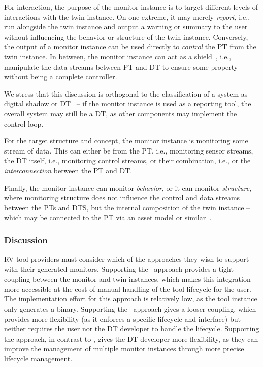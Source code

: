 For interaction, the purpose of the monitor instance is to target different levels of interactions with the twin instance.
On one extreme, it may merely \emph{report}, i.e., run alongside the twin instance and output a warning or summary to the user without influencing the behavior or structure of the twin instance.
Conversely, the output of a monitor instance can be used directly to \emph{control} the PT from the twin instance.
In between, the monitor instance can act as a  shield~\cite{DBLP:conf/tacas/BloemKKW15}, i.e., manipulate the data streams between PT and DT to ensure some property without being a complete controller.

We stress that this discussion is orthogonal to the classification of a system as digital shadow or DT~\cite{KRITZINGER20181016} -- if the monitor instance is used as a reporting tool, the overall system may still be a DT, as other components may implement the control loop.

For the target structure and concept, the monitor instance is monitoring some stream of data. This can either be from the PT, i.e., monitoring sensor streams, the DT itself, i.e., monitoring control streams, or their combination, i.e., or the \emph{interconnection} between the PT and DT.

Finally, the monitor instance can monitor \emph{behavior}, or it can monitor \emph{structure}, where monitoring structure does not influence the control and data streams between the PTs and DTS, but the internal composition of the twin instance -- which may be connected to the PT via an asset model or similar~\cite{DBLP:conf/isola/KamburjanKSTCJ22}.


\subsubsection{Discussion}
RV tool providers must consider which of the approaches they wish to support with their generated monitors.
Supporting the \methodone\ approach provides a tight coupling between the monitor and twin instances, which makes this integration more accessible at the cost of manual handling of the tool lifecycle for the user.
The implementation effort for this approach is relatively low, as the tool instance only generates a binary.
Supporting the \methodtwo\ approach gives a looser coupling, which provides more flexibility (as it enforces a specific lifecycle and interface) but neither requires the user nor the DT developer to handle the lifecycle.
Supporting the \methodthree approach, in contrast to \methodtwo, gives the DT developer more flexibility, as they can improve the management of multiple monitor instances through more precise lifecycle management.

